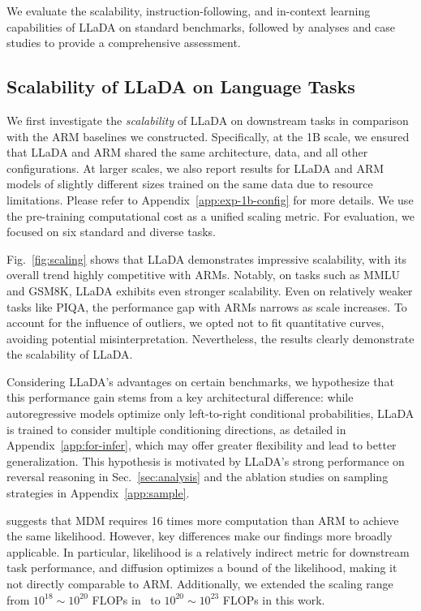 \documentclass{article}
\begin{document}
We evaluate the scalability, instruction-following, and in-context learning capabilities of LLaDA on standard benchmarks, followed by analyses and case studies to provide a comprehensive assessment.

\subsection{Scalability of LLaDA on Language Tasks}
\label{sec:scaling}

We first investigate the \emph{scalability} of LLaDA on downstream tasks in comparison with the ARM baselines we constructed. Specifically, at the 1B scale, we ensured that LLaDA and ARM shared the same architecture, data, and all other configurations. At larger scales, we also report results for LLaDA and ARM models of slightly different sizes trained on the same data due to resource limitations. Please refer to Appendix~\ref{app:exp-1b-config} for more details. We use the pre-training computational cost as a unified scaling metric. For evaluation, we focused on six standard and diverse tasks.

Fig.~\ref{fig:scaling} shows that LLaDA demonstrates impressive scalability, with its overall trend highly competitive with ARMs. Notably, on tasks such as MMLU and GSM8K, LLaDA exhibits even stronger scalability. Even on relatively weaker tasks like PIQA, the performance gap with ARMs narrows as scale increases. To account for the influence of outliers, we opted not to fit quantitative curves, avoiding potential misinterpretation. Nevertheless, the results clearly demonstrate the scalability of LLaDA. 

Considering LLaDA’s advantages on certain benchmarks, we hypothesize that this performance gain stems from a key architectural difference: while autoregressive models optimize only left-to-right conditional probabilities, LLaDA is trained to consider multiple conditioning directions, as detailed in Appendix~\ref{app:for-infer}, which may offer greater flexibility and lead to better generalization. This hypothesis is motivated by LLaDA’s strong performance on reversal reasoning in Sec.~\ref{sec:analysis} and the ablation studies on sampling strategies in Appendix~\ref{app:sample}.


\citet{nie2024scaling} suggests that MDM requires 16 times more computation than ARM to achieve the same likelihood. However, key differences make our findings more broadly applicable. In particular, likelihood is a relatively indirect metric for downstream task performance, and diffusion optimizes a bound of the likelihood, making it not directly comparable to ARM. Additionally, we extended the scaling range from $10^{18}\sim10^{20}$ FLOPs in~\citet{nie2024scaling} to $10^{20} \sim 10^{23}$ FLOPs in this work.
\end{document}
